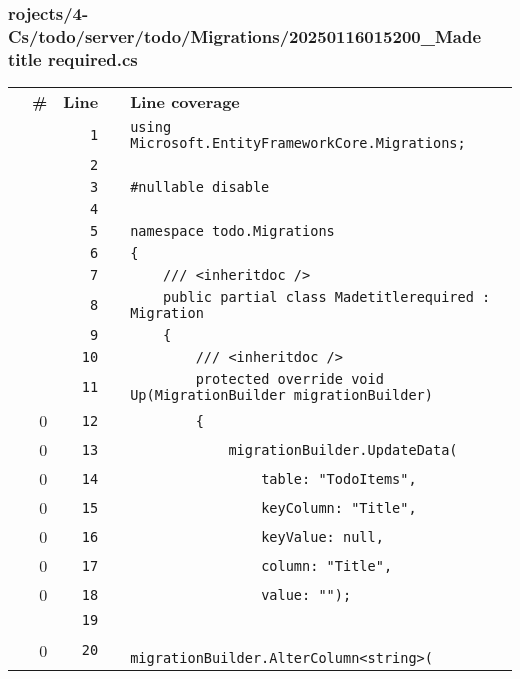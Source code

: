\documentclass[a4paper,landscape,10pt]{article}
\begin{document}
\subsubsection{rojects/4-Cs/todo/server/todo/Migrations/20250116015200\_Made title required.cs}
\begin{longtable}[l]{lrrll}
\textbf{} & \textbf{\#} & \textbf{Line} & \textbf{} & \textbf{Line coverage}\\
\cellcolor{gray} &  & \verb~1~ & & \verb~using Microsoft.EntityFrameworkCore.Migrations;~\\
\cellcolor{gray} &  & \verb~2~ & & \verb~~\\
\cellcolor{gray} &  & \verb~3~ & & \verb~#nullable disable~\\
\cellcolor{gray} &  & \verb~4~ & & \verb~~\\
\cellcolor{gray} &  & \verb~5~ & & \verb~namespace todo.Migrations~\\
\cellcolor{gray} &  & \verb~6~ & & \verb~{~\\
\cellcolor{gray} &  & \verb~7~ & & \verb~    /// <inheritdoc />~\\
\cellcolor{gray} &  & \verb~8~ & & \verb~    public partial class Madetitlerequired : Migration~\\
\cellcolor{gray} &  & \verb~9~ & & \verb~    {~\\
\cellcolor{gray} &  & \verb~10~ & & \verb~        /// <inheritdoc />~\\
\cellcolor{gray} &  & \verb~11~ & & \verb~        protected override void Up(MigrationBuilder migrationBuilder)~\\
\cellcolor{red} & 0 & \verb~12~ & & \verb~        {~\\
\cellcolor{red} & 0 & \verb~13~ & & \verb~            migrationBuilder.UpdateData(~\\
\cellcolor{red} & 0 & \verb~14~ & & \verb~                table: "TodoItems",~\\
\cellcolor{red} & 0 & \verb~15~ & & \verb~                keyColumn: "Title",~\\
\cellcolor{red} & 0 & \verb~16~ & & \verb~                keyValue: null,~\\
\cellcolor{red} & 0 & \verb~17~ & & \verb~                column: "Title",~\\
\cellcolor{red} & 0 & \verb~18~ & & \verb~                value: "");~\\
\cellcolor{gray} &  & \verb~19~ & & \verb~~\\
\cellcolor{red} & 0 & \verb~20~ & & \verb~            migrationBuilder.AlterColumn<string>(~\\

\end{longtable}
\end{document}
